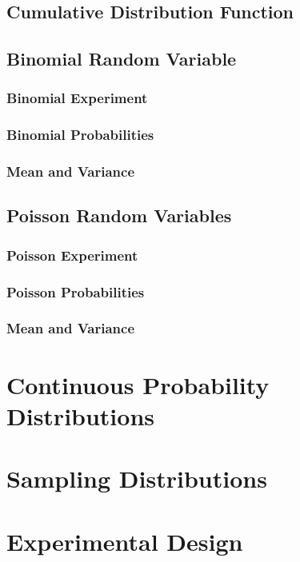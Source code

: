 \documentclass{report}
\begin{document}
    \section{Cumulative Distribution Function}  %

    \section{Binomial Random Variable}  %
        \subsection{Binomial Experiment}  %
        \subsection{Binomial Probabilities}  %
        \subsection{Mean and Variance}  %

    \section{Poisson Random Variables}  %
        \subsection{Poisson Experiment}  %
        \subsection{Poisson Probabilities}  %
        \subsection{Mean and Variance}  %

\chapter{Continuous Probability Distributions}  %
\chapter{Sampling Distributions}  %
\chapter{Experimental Design}  %
\end{document}
